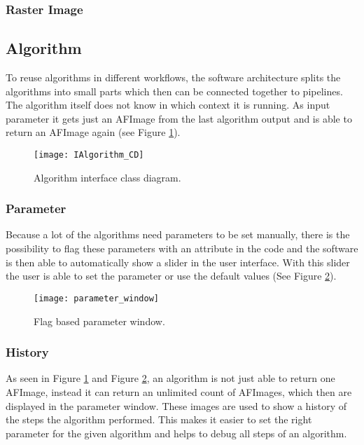 \subsubsection{Raster Image}

\subsection{Algorithm}
To reuse algorithms in different workflows, the software architecture splits the algorithms into small parts which then can be connected together to pipelines. The algorithm itself does not know in which context it is running. As input parameter it gets just an AFImage from the last algorithm output and is able to return an AFImage again (see Figure \ref{fig:IAlgorithm_CD}). 

\begin{figure}[h]
  \centering
      \texttt{[image: IAlgorithm\_CD]}
  \caption{Algorithm interface class diagram.}
  \label{fig:IAlgorithm_CD}
\end{figure}

\subsubsection{Parameter}
Because a lot of the algorithms need parameters to be set manually, there is the possibility to flag these parameters with an attribute in the code and the software is then able to automatically show a slider in the user interface. With this slider the user is able to set the parameter or use the default values (See Figure \ref{fig:parameter_window}).


\begin{figure}[h]
  \centering
      \texttt{[image: parameter\_window]}
  \caption{Flag based parameter window.}
  \label{fig:parameter_window}
\end{figure}

\subsubsection{History}
As seen in Figure \ref{fig:IAlgorithm_CD} and Figure \ref{fig:parameter_window}, an algorithm is not just able to return one AFImage, instead it can return an unlimited count of AFImages, which then are displayed in the parameter window. These images are used to show a history of the steps the algorithm performed. This makes it easier to set the right parameter for the given algorithm and helps to debug all steps of an algorithm.

